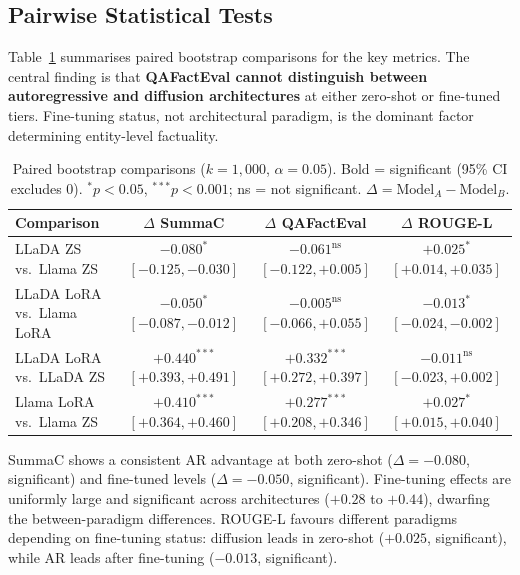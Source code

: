 \documentclass[11pt]{article}
\begin{document}
\subsection{Pairwise Statistical Tests}

Table~\ref{tab:pairwise} summarises paired bootstrap comparisons for the key
metrics. The central finding is that \textbf{QAFactEval cannot distinguish
between autoregressive and diffusion architectures} at either zero-shot or
fine-tuned tiers. Fine-tuning status, not architectural paradigm, is the
dominant factor determining entity-level factuality.

\begin{table}[htbp]
\small
\centering
\begin{tabular}{lccc}
\hline
\textbf{Comparison} & $\Delta$ \textbf{SummaC} & $\Delta$ \textbf{QAFactEval} & $\Delta$ \textbf{ROUGE-L} \\
\hline
LLaDA ZS vs.\ Llama ZS     & $\mathbf{-0.080}^{*}$ $[-0.125, -0.030]$ & $-0.061^{\mathrm{ns}}$ $[-0.122, +0.005]$ & $\mathbf{+0.025}^{*}$ $[+0.014, +0.035]$ \\
LLaDA LoRA vs.\ Llama LoRA & $\mathbf{-0.050}^{*}$ $[-0.087, -0.012]$ & $-0.005^{\mathrm{ns}}$ $[-0.066, +0.055]$ & $\mathbf{-0.013}^{*}$ $[-0.024, -0.002]$ \\
LLaDA LoRA vs.\ LLaDA ZS   & $\mathbf{+0.440}^{***}$ $[+0.393, +0.491]$ & $\mathbf{+0.332}^{***}$ $[+0.272, +0.397]$ & $-0.011^{\mathrm{ns}}$ $[-0.023, +0.002]$ \\
Llama LoRA vs.\ Llama ZS   & $\mathbf{+0.410}^{***}$ $[+0.364, +0.460]$ & $\mathbf{+0.277}^{***}$ $[+0.208, +0.346]$ & $\mathbf{+0.027}^{*}$ $[+0.015, +0.040]$ \\
\hline
\end{tabular}
\caption{Paired bootstrap comparisons ($k=1{,}000$, $\alpha=0.05$). Bold = significant (95\% CI excludes 0).
$^{*}p < 0.05$, $^{***}p < 0.001$; ns = not significant. $\Delta = \mathrm{Model}_A - \mathrm{Model}_B$.}
\label{tab:pairwise}
\end{table}

SummaC shows a consistent AR advantage at both zero-shot
($\Delta = -0.080$, significant) and fine-tuned levels
($\Delta = -0.050$, significant). Fine-tuning effects are uniformly large and
significant across architectures ($+0.28$ to $+0.44$), dwarfing the
between-paradigm differences. ROUGE-L favours different paradigms depending
on fine-tuning status: diffusion leads in zero-shot ($+0.025$, significant),
while AR leads after fine-tuning ($-0.013$, significant).
\end{document}
